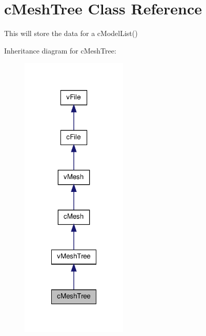 \hypertarget{classc_mesh_tree}{
\section{cMeshTree Class Reference}
\label{classc_mesh_tree}
}


This will store the data for a cModelList()  




Inheritance diagram for cMeshTree:
\nopagebreak
\begin{figure}[H]
\begin{center}
\leavevmode
\includegraphics[width=144pt]{classc_mesh_tree__inherit__graph}
\end{center}
\end{figure}


